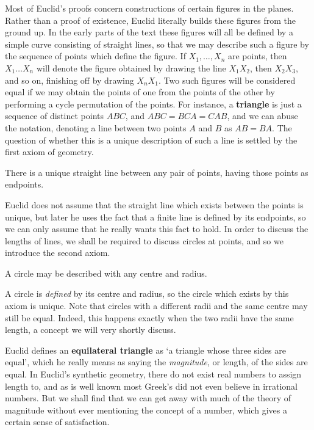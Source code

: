 Most of Euclid's proofs concern constructions of certain figures in the planes. Rather than a proof of existence, Euclid literally builds these figures from the ground up. In the early parts of the text these figures will all be defined by a simple curve consisting of straight lines, so that we may describe such a figure by the sequence of points which define the figure. If $X_1, \dots, X_n$ are points, then $X_1 \dots X_n$ will denote the figure obtained by drawing the line $X_1 X_2$, then $X_2 X_3$, and so on, finishing off by drawing $X_n X_1$. Two such figures will be considered equal if we may obtain the points of one from the points of the other by performing a cycle permutation of the points. For instance, a {\bf triangle} is just a sequence of distinct points $ABC$, and $ABC = BCA = CAB$, and we can abuse the notation, denoting a line between two points $A$ and $B$ as $AB = BA$. The question of whether this is a unique description of such a line is settled by the first axiom of geometry.

\begin{axiom}
    There is a unique straight line between any pair of points, having those points as endpoints.
\end{axiom}

Euclid does not assume that the straight line which exists between the points is unique, but later he uses the fact that a finite line is defined by its endpoints, so we can only assume that he really wants this fact to hold. In order to discuss the lengths of lines, we shall be required to discuss circles at points, and so we introduce the second axiom.

\begin{axiom}
    A circle may be described with any centre and radius.
\end{axiom}

A circle is {\it defined} by its centre and radius, so the circle which exists by this axiom is unique. Note that circles with a different radii and the same centre may still be equal. Indeed, this happens exactly when the two radii have the same length, a concept we will very shortly discuss.

Euclid defines an {\bf equilateral triangle} as `a triangle whose three sides are equal', which he really means as saying the {\it magnitude}, or length, of the sides are equal. In Euclid's synthetic geometry, there do not exist real numbers to assign length to, and as is well known most Greek's did not even believe in irrational numbers. But we shall find that we can get away with much of the theory of magnitude without ever mentioning the concept of a number, which gives a certain sense of satisfaction.

